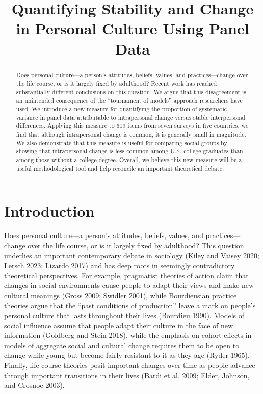 \documentclass[
  12pt,
]{article}
\title{Quantifying Stability and Change in Personal Culture Using Panel
Data}
\author{}
\date{\vspace{-2.5em}}
\begin{document}
\maketitle
\begin{abstract}
Does personal culture---a person's attitudes, beliefs, values, and
practices---change over the life course, or is it largely fixed by
adulthood? Recent work has reached substantially different conclusions
on this question. We argue that this disagreement is an unintended
consequence of the ``tournament of models'' approach researchers have
used. We introduce a new measure for quantifying the proportion of
systematic variance in panel data attributable to intrapersonal change
versus stable interpersonal differences. Applying this measure to 609
items from seven surveys in five countries, we find that although
intrapersonal change is common, it is generally small in magnitude. We
also demonstrate that this measure is useful for comparing social groups
by showing that intrapersonal change is less common among U.S. college
graduates than among those without a college degree. Overall, we believe
this new measure will be a useful methodological tool and help reconcile
an important theoretical debate.
\end{abstract}

\hypertarget{introduction}{%
\section{Introduction}\label{introduction}}

Does personal culture---a person's attitudes, beliefs, values, and
practices---change over the life course, or is it largely fixed by
adulthood? This question underlies an important contemporary debate in
sociology (Kiley and Vaisey 2020; Lersch 2023; Lizardo 2017) and has
deep roots in seemingly contradictory theoretical perspectives. For
example, pragmatist theories of action claim that changes in social
environments cause people to adapt their views and make new cultural
meanings (Gross 2009; Swidler 2001), while Bourdieusian practice
theories argue that the ``past conditions of production'' leave a mark
on people's personal culture that lasts throughout their lives (Bourdieu
1990). Models of social influence assume that people adapt their culture
in the face of new information (Goldberg and Stein 2018), while the
emphasis on cohort effects in models of aggregate social and cultural
change requires them to be open to change while young but become fairly
resistant to it as they age (Ryder 1965). Finally, life course theories
posit important changes over time as people advance through important
transitions in their lives (Bardi et al. 2009; Elder, Johnson, and
Crosnoe 2003).
\end{document}
